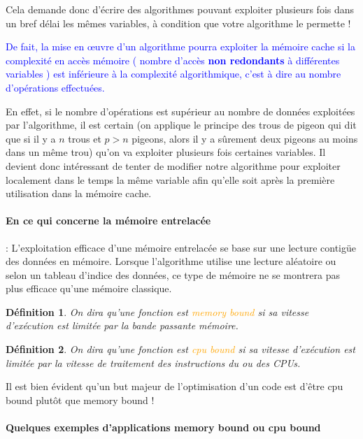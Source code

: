 \documentclass[fleqn,11pt]{article}
\newtheorem{definition}{Définition }
\begin{document}
Cela demande donc d'écrire des algorithmes pouvant exploiter plusieurs fois dans un bref délai les mêmes variables, à condition que votre algorithme le permette !

\textcolor{blue}{De fait, la mise en {\oe}uvre d'un algorithme pourra exploiter la mémoire cache si la complexité en accès mémoire ( nombre d'accès \textbf{non redondants} à différentes variables ) 
est inférieure à la complexité algorithmique, c'est à dire au nombre d'opérations effectuées.}

En effet, si le nombre d'opérations est supérieur au nombre de données exploitées par l'algorithme,
il est certain (on applique le principe des trous de pigeon qui dit que si il y a $n$ trous
et $p>n$ pigeons, alors il y a sûrement deux pigeons au moins dans un même trou) qu'on va exploiter plusieurs
fois certaines variables. Il devient donc intéressant de tenter de modifier notre algorithme pour exploiter
localement dans le temps la même variable afin qu'elle soit après la première utilisation dans la
mémoire cache.

\paragraph{En ce qui concerne la mémoire entrelacée} : L'exploitation efficace d'une mémoire entrelacée se base sur une lecture contigüe des données en mémoire. Lorsque l'algorithme utilise une lecture aléatoire ou selon un tableau d'indice des données, ce type de mémoire ne se montrera pas plus efficace qu'une mémoire classique.


\begin{definition}
On dira qu'une fonction est \textcolor{orange}{memory bound} si sa vitesse d'exécution est limitée par la bande passante mémoire.
\end{definition}

\begin{definition}
On dira qu'une fonction est \textcolor{orange}{cpu bound} si sa vitesse d'exécution est limitée par la vitesse de traitement des instructions du ou des CPUs.
\end{definition}

Il est bien évident qu'un but majeur de l'optimisation d'un code est d'être cpu bound plutôt que memory bound !

\paragraph{Quelques exemples d'applications memory bound ou cpu bound}
\end{document}
